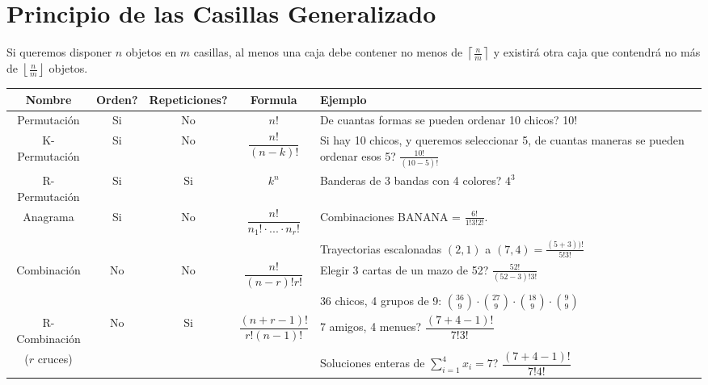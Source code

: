 \documentclass[11pt,a4paper]{article}
\begin{document}
\section{Principio de las Casillas Generalizado}
Si queremos disponer $n$ objetos en $m$ casillas, al menos una caja debe contener no menos de $\left \lceil{\frac{n}{m}}\right \rceil$ y existir\'a otra caja que contendr\'a no m\'as de $\left \lfloor{\frac{n}{m}}\right \rfloor$ objetos.

\newpage
\begin{table}
{
\renewcommand{\arraystretch}{2}
\hspace{-1cm}
\begin{tabular}{|c|c|c|c|p{8.7cm}|}
\hline
Nombre & Orden? & Repeticiones? & Formula & Ejemplo \\
\hline
Permutaci\'on & Si & No & $n!$ & De cuantas formas se pueden ordenar 10 chicos? 10!\\
\hline
K-Permutaci\'on & Si & No & $\dfrac{n!}{(n-k)!}$ & Si hay 10 chicos, y queremos seleccionar 5, de cuantas maneras se pueden ordenar esos 5? $\frac{10!}{(10-5)!}$\\
\hline
R-Permutaci\'on & Si & Si & $k^n$ & Banderas de 3 bandas con 4 colores? $4^3$\\
\hline
Anagrama & Si & No & $\dfrac{n!}{n_1! \cdot ... \cdot n_r!}$ & Combinaciones BANANA = $\frac{6!}{1!3!2!}$. \\ & & & & Trayectorias escalonadas $(2,1)$ a $(7,4) = \frac{(5+3))!}{5!3!}$\\
\hline
Combinaci\'on & No & No & $\dfrac{n!}{(n-r)!r!}$ & Elegir 3 cartas de un mazo de 52? $\frac{52!}{(52-3)!3!}$ \\ & & & & 36 chicos, 4 grupos de 9: ${36 \choose 9} \cdot {27 \choose 9} \cdot {18 \choose 9} \cdot {9 \choose 9}$\\
\hline
R-Combinaci\'on & No & Si & $\dfrac{(n+r-1)!}{r!(n-1)!}$ & 7 amigos, 4 menues? $\dfrac{(7+4-1)!}{7!3!}$ \\ ($r$ cruces) & & & & Soluciones enteras de $\sum_{i=1}^4 x_i = 7$? $\dfrac{(7+4-1)!}{7!4!}$\\
\hline
\end{tabular}
}
\end{table}
\end{document}
